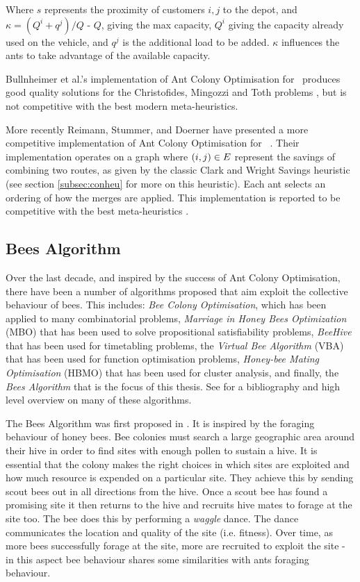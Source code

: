 Where $s$ represents the proximity of customers $i, j$ to the depot, and $\kappa = (Q^i + q^j) / Q$ - $Q$, giving the max capacity, $Q^i$ giving the capacity already used on the vehicle, and $q^j$ is the additional load to be added. $\kappa$ influences the ants to take advantage of the available capacity. 

Bullnheimer et al.'s implementation of Ant Colony Optimisation for \VRP\ produces good quality solutions for the Christofides, Mingozzi and Toth problems \cite{CMT:1981}, but is not competitive with the best modern meta-heuristics.

More recently Reimann, Stummer, and Doerner have presented a more competitive implementation of Ant Colony Optimisation for \VRP\ \cite{RSD:2002}. Their implementation operates on a graph where $(i,j) \in E$ represent the savings of combining two routes, as given by the classic Clark and Wright Savings heuristic (see section \ref{subsec:conheu} for more on this heuristic). Each ant selects an ordering of how the merges are applied. This implementation is reported to be competitive with the best meta-heuristics \cite{Potvin:2009}.   

\subsection{Bees Algorithm}
\label{subsec:beesalgorithm}

Over the last decade, and inspired by the success of Ant Colony Optimisation, there have been a number of algorithms proposed that aim exploit the collective behaviour of bees. This includes: \emph{Bee Colony Optimisation}, which has been applied to many combinatorial problems, \emph{Marriage in Honey Bees Optimization} (MBO) that has been used to solve propositional satisfiability problems, \emph{BeeHive} that has been used for timetabling problems, the \emph{Virtual Bee Algorithm} (VBA) that has been used for function optimisation problems, \emph{Honey-bee Mating Optimisation} (HBMO) that has been used for cluster analysis, and finally, the \emph{Bees Algorithm} that is the focus of this thesis. See \cite{LJDS:2009} for a bibliography and high level overview on many of these algorithms. 

The Bees Algorithm was first proposed in \cite{PGKORZ:2005}. It is inspired by the foraging behaviour of honey bees. Bee colonies must search a large geographic area around their hive in order to find sites with enough pollen to sustain a hive. It is essential that the colony makes the right choices in which sites are exploited and how much resource is expended on a particular site. They achieve this by sending scout bees out in all directions from the hive. Once a scout bee has found a promising site it then returns to the hive and recruits hive mates to forage at the site too. The bee does this by performing a \emph{waggle} dance. The dance communicates the location and quality of the site (i.e. fitness). Over time, as more bees successfully forage at the site, more are recruited to exploit the site - in this aspect bee behaviour shares some similarities with ants foraging behaviour. 

